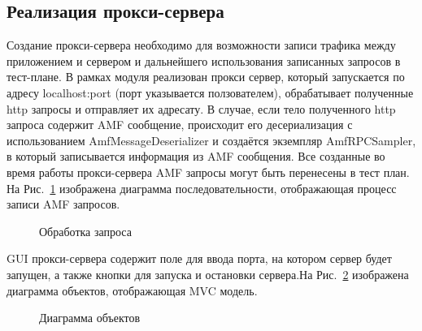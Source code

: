 \subsection{Реализация прокси-сервера}

Создание прокси-сервера необходимо для возможности записи трафика между приложением и сервером и дальнейшего использования 
записанных запросов в тест-плане. В рамках модуля реализован прокси сервер, который запускается по адресу 
localhost:port (порт указывается ползователем), обрабатывает полученные http запросы и отправляет их адресату. 
В случае, если тело полученного http запроса содержит AMF сообщение, происходит его десериализация с использованием 
AmfMessageDeserializer и создаётся экземпляр 
AmfRPCSampler, в который записывается информация из AMF сообщения. Все созданные во время работы прокси-сервера AMF запросы 
могут быть перенесены в тест план. На Рис.~\ref{ris:Diagram1.png} изображена диаграмма последовательности, отображающая
процесс записи AMF запросов.

\begin{figure}[ht]
\caption{Обработка запроса}
\label{ris:Diagram1.png}
\end{figure}

GUI прокси-сервера содержит поле для ввода порта, на котором сервер будет запущен, а также кнопки для запуска и остановки 
сервера.На Рис.~\ref{ris:Diagram2.png} изображена диаграмма объектов, отображающая MVC модель.

\begin{figure}[ht]
\caption{Диаграмма объектов}
\label{ris:Diagram2.png}
\end{figure}

